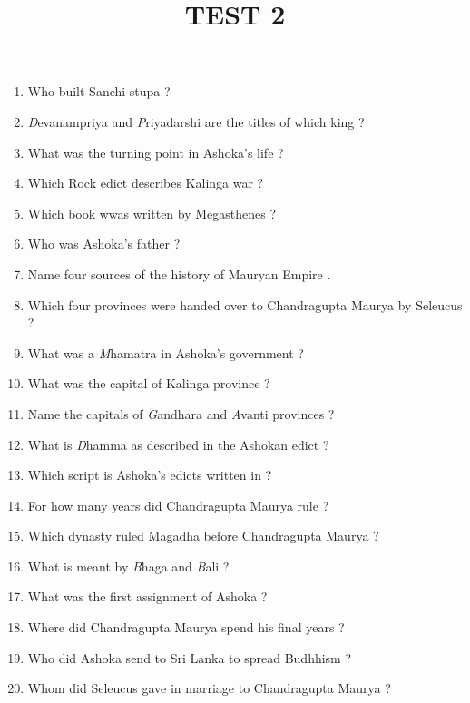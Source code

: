 \documentclass[16pt , a4paper]{article}
\title{TEST 2 }
\date{}
\begin{document}
 
\maketitle
\begin{enumerate}

\item Who built Sanchi stupa ? 
\item \textit Devanampriya and \textit Priyadarshi are the titles of  which king ? 
\item What was the turning point in Ashoka's life ? 
\item Which Rock edict describes Kalinga war ? 
\item Which book wwas written by Megasthenes ? 
\item Who was Ashoka's father ? 
\item Name four sources of the history of Mauryan Empire . 
\item Which four provinces were handed over to Chandragupta Maurya by Seleucus ? 
\item What was a \textit Mhamatra in Ashoka's government ? 
\item What was the capital of Kalinga province ? 
\item Name the capitals of \textit Gandhara and \textit Avanti provinces ? 
\item What is \textit Dhamma as described in the Ashokan edict ? 
\item Which script is Ashoka's edicts written in ? 
\item For how many years did Chandragupta Maurya rule ? 
\item Which dynasty ruled Magadha before Chandragupta Maurya ? 
\item What is meant by \textit Bhaga and \textit Bali ? 
\item What was the first assignment of Ashoka ? 
\item Where did Chandragupta Maurya spend his final years ? 
\item Who did Ashoka send to Sri Lanka to spread Budhhism ? 
\item Whom did Seleucus gave in marriage to Chandragupta Maurya ?



\end {enumerate} 
\end{document}
